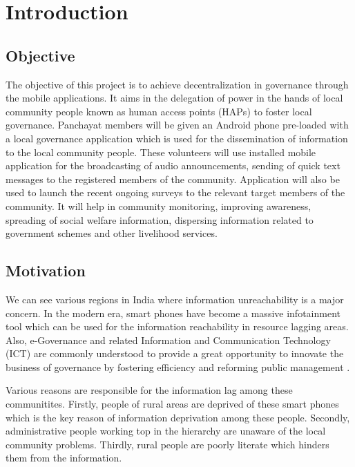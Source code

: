 \chapter{Introduction}


\section{Objective}
The objective of  this project is to achieve decentralization in governance through the mobile applications. It aims in the delegation of power in the hands of local community people known as human access points (HAPs) to foster local governance. Panchayat members will be given an Android phone pre-loaded with a local governance application which is used for the dissemination of information to the local community people. These volunteers will use installed mobile application for the broadcasting of audio announcements, sending of quick text messages to the registered members of the community. Application will also be used to launch the recent ongoing surveys to the relevant target members of the community. It will help in community monitoring, improving awareness, spreading of social welfare information, dispersing information related to government schemes and other livelihood services.

\section{Motivation}
We can see various regions in India where information unreachability is a major concern. In the modern era, smart phones have  become a massive infotainment tool which can be used for the information reachability in resource lagging areas. Also, e-Governance and related Information and Communication Technology (ICT) are commonly understood to provide a great opportunity to innovate the business of governance by fostering efficiency and reforming public management \cite{ict1}.

Various reasons are responsible for the information lag among these communitites. Firstly, people of rural areas are deprived of these smart phones which is the key reason of information deprivation among these people. Secondly, administrative people working top in the hierarchy are unaware of the local community problems. Thirdly, rural people are poorly literate which hinders them from the information. 

